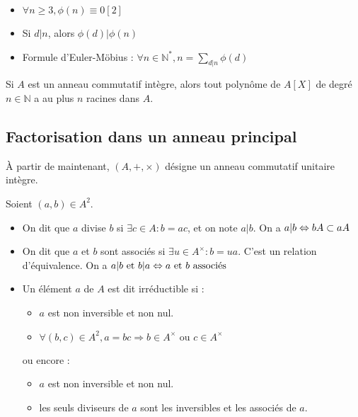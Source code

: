 \begin{prop}\begin{itemize}
    \item $\forall n\geq3, \phi(n)\equiv 0[2]$
    \item Si $d|n$, alors $\phi(d)|\phi(n)$
    \item Formule d'Euler-M\"{o}bius : $\forall n\in\mathbb{N}^*, n=\sum_{d|n} \phi(d)$
\end{itemize}\end{prop}

\begin{prop} Si $A$ est un anneau commutatif intègre, alors tout polynôme de $A[X]$ de degré $n\in\mathbb{N}$ a au plus $n$ racines dans $A$.
\end{prop}

\subsection{Factorisation dans un anneau principal}
À partir de maintenant, $(A, +, \times)$ désigne un anneau commutatif unitaire intègre.

\begin{defi} Soient $(a,b)\in A^2$.\begin{itemize}
    \item On dit que $a$ divise $b$ si $\exists c\in A:b = ac$, et on note $a|b$. On a $a|b \Leftrightarrow bA\subset aA$
    \item On dit que $a$ et $b$ sont associés si $\exists u\in A^\times : b=ua$. C'est un relation d'équivalence. On a $a|b\text{ et }b|a\Leftrightarrow a\text{ et }b\text{ associés}$
    \item Un élément $a$ de $A$ est dit irréductible si :\begin{itemize}
            \item $a$ est non inversible et non nul.
            \item $\forall (b,c)\in A^2, a=bc \Rightarrow b\in A^\times \text{ ou } c\in A^\times$
        \end{itemize} ou encore :\begin{itemize}
            \item $a$ est non inversible et non nul.
            \item les seuls diviseurs de $a$ sont les inversibles et les associés de $a$.
        \end{itemize}
\end{itemize}\end{defi}


